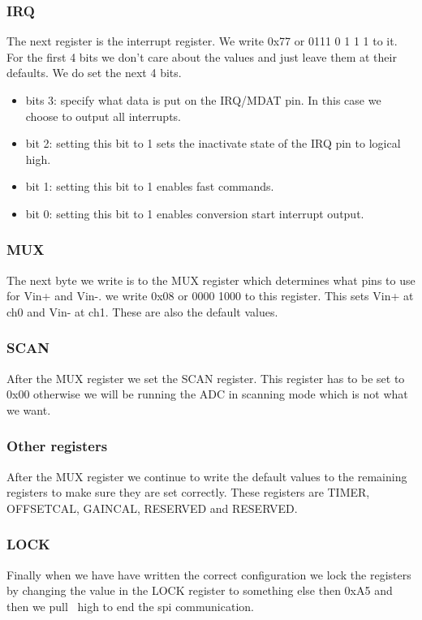     \subsubsection*{IRQ}\label{sss: IRQ}
      The next register is the interrupt register. We write 0x77 or 0111 0 1 1 1 to it. For the first 4 bits we don't care about the values and just leave them at their defaults.
      We do set the next 4 bits.
      \begin{itemize}
        \item bits 3: specify what data is put on the IRQ/MDAT pin. In this case we choose to output all interrupts.
        \item bit 2: setting this bit to 1 sets the inactivate state of the IRQ pin to logical high.
        \item bit 1: setting this bit to 1 enables fast commands.
        \item  bit 0: setting this bit to 1 enables conversion start interrupt output.
      \end{itemize}

    \subsubsection*{MUX}\label{sss: MUX}
      The next byte we write is to the MUX register which determines what pins to use for Vin+ and Vin-. we write 0x08 or 0000 1000 to this register. This sets Vin+ at ch0 and Vin- at ch1. These are also the default values.

    \subsubsection*{SCAN}\label{sss: SCAN}
      After the MUX register we set the SCAN register. This register has to be set to 0x00 otherwise we will be running the ADC in scanning mode which is not what we want.

    \subsubsection*{Other registers}\label{sss: Other registers}
      After the MUX register we continue to write the default values to the remaining registers to make sure they are set correctly. These registers are TIMER, OFFSETCAL, GAINCAL, RESERVED and RESERVED.

    \subsubsection*{LOCK}\label{sss: LOCK}
      Finally when we have have written the correct configuration we lock the registers by changing the value in the LOCK register to something else then 0xA5 and then we pull \pcs~high to end the spi communication.

